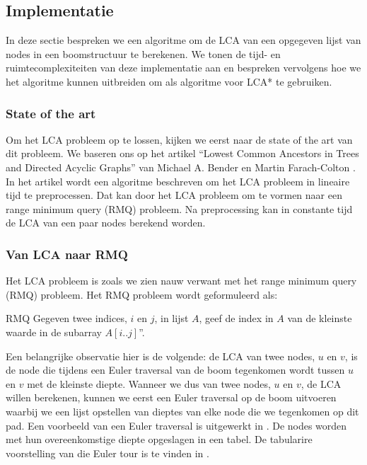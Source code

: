 \subsection{Implementatie}
In deze sectie bespreken we een algoritme om de LCA van een opgegeven lijst van
nodes in een boomstructuur te berekenen. We tonen de tijd- en
ruimtecomplexiteiten van deze implementatie aan en bespreken vervolgens hoe we
het algoritme kunnen uitbreiden om als algoritme voor LCA* te gebruiken.

\subsubsection{State of the art}

Om het LCA probleem op te lossen, kijken we eerst naar de state of the art van
dit probleem. We baseren ons op het artikel ``Lowest Common Ancestors in Trees
and Directed Acyclic Graphs'' van Michael A. Bender en Martin Farach-Colton
\cites{lcabenderfarach}. In het artikel wordt een algoritme beschreven om het
LCA probleem in lineaire tijd te preprocessen. Dat kan door het LCA probleem om
te vormen naar een range minimum query (RMQ) probleem. Na preprocessing kan in
constante tijd de LCA van een paar nodes berekend worden.


\subsubsection{Van LCA naar RMQ}

Het LCA probleem is zoals we zien nauw verwant met het range minimum query (RMQ)
probleem. Het RMQ probleem  wordt geformuleerd als: 

\theoremstyle{definition}
\begin{definition}{RMQ}
Gegeven twee indices, $i$ en $j$, in lijst $A$, geef de index in $A$ van de 
kleinste waarde in de subarray $A[i..j]$''.
\end{definition}

Een belangrijke observatie hier is de volgende: de LCA van twee nodes, $u$ en
$v$, is de node die tijdens een Euler traversal van de boom tegenkomen wordt
tussen $u$ en $v$ met de kleinste diepte. Wanneer we dus van twee nodes, $u$ en
$v$, de LCA willen berekenen, kunnen we eerst een Euler traversal op de boom
uitvoeren waarbij we een lijst opstellen van dieptes van elke node die we
tegenkomen op dit pad. Een voorbeeld van een Euler traversal is uitgewerkt in
. De nodes worden met hun overeenkomstige diepte opgeslagen
in een tabel. De tabularire voorstelling van die Euler tour is te vinden in
.

